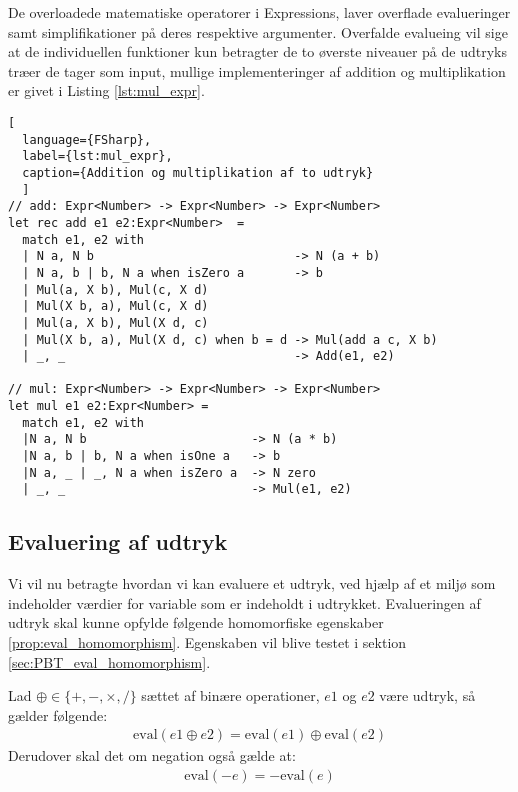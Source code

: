 \documentclass{article}
\begin{document}
De overloadede matematiske operatorer i Expressions, laver overflade evalueringer samt simplifikationer på deres respektive argumenter. Overfalde evalueing vil sige at de individuellen funktioner kun betragter de to øverste niveauer på de udtryks træer de tager som input, mullige implementeringer af addition og multiplikation er givet i Listing \ref{lst:mul_expr}. 

\begin{lstlisting}[
  language={FSharp}, 
  label={lst:mul_expr}, 
  caption={Addition og multiplikation af to udtryk}
  ]
// add: Expr<Number> -> Expr<Number> -> Expr<Number>
let rec add e1 e2:Expr<Number>  =
  match e1, e2 with
  | N a, N b                            -> N (a + b)
  | N a, b | b, N a when isZero a       -> b
  | Mul(a, X b), Mul(c, X d) 
  | Mul(X b, a), Mul(c, X d)
  | Mul(a, X b), Mul(X d, c) 
  | Mul(X b, a), Mul(X d, c) when b = d -> Mul(add a c, X b)  
  | _, _                                -> Add(e1, e2)

// mul: Expr<Number> -> Expr<Number> -> Expr<Number>
let mul e1 e2:Expr<Number> =
  match e1, e2 with
  |N a, N b                       -> N (a * b)
  |N a, b | b, N a when isOne a   -> b
  |N a, _ | _, N a when isZero a  -> N zero
  | _, _                          -> Mul(e1, e2)
\end{lstlisting}

\subsection{Evaluering af udtryk}
Vi vil nu betragte hvordan vi kan evaluere et udtryk, ved hjælp af et miljø som indeholder værdier for variable som er indeholdt i udtrykket. Evalueringen af udtryk skal kunne opfylde følgende homomorfiske egenskaber \ref{prop:eval_homomorphism}. Egenskaben vil blive testet i sektion \ref{sec:PBT_eval_homomorphism}.
\vspace{0.5cm}
\begin{egenskab}\label{prop:eval_homomorphism}
Lad $\oplus \in \{+, -, \times, /\}$ sættet af binære operationer, $e1$ og $e2$ være udtryk, så gælder følgende:
\begin{align*}
    \text{eval}(e1 \oplus e2) = \text{eval}(e1) \oplus \text{eval}(e2)
\end{align*}
Derudover skal det om negation også gælde at:
\begin{align*}
    \text{eval}(-e) = -\text{eval}(e)
\end{align*}
\end{egenskab}
\end{document}
